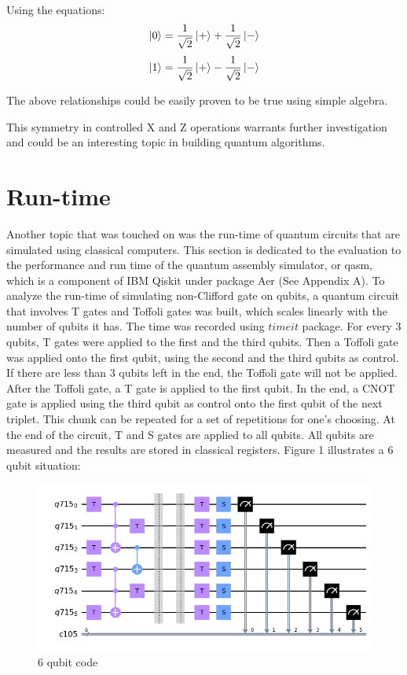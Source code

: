 \documentclass{article}
\begin{document}
Using the equations: 
\begin{equation}
    \ket{0} = \frac{1}{\sqrt{2}} \ket{+} + \frac{1}{\sqrt{2}} \ket{-}
\end{equation}
\begin{equation}
    \ket{1} = \frac{1}{\sqrt{2}} \ket{+} - \frac{1}{\sqrt{2}} \ket{-}
\end{equation}

The above relationships could be easily proven to be true using simple algebra.

This symmetry in controlled X and Z operations warrants further investigation and could be an interesting topic in building quantum algorithms.
\newpage
\section{Run-time}

Another topic that was touched on was the run-time of quantum circuits that are simulated using classical computers. This section is dedicated to the evaluation to the performance and run time of the quantum assembly simulator, or qasm, which is a component of IBM Qiskit under package Aer (See Appendix A). To analyze the run-time of simulating non-Clifford gate on qubits, a quantum circuit that involves T gates and Toffoli gates was built, which scales linearly with the number of qubits it has. The time was recorded using $timeit$ package. For every 3 qubits, T gates were applied to the first and the third qubits. Then a Toffoli gate was applied onto the first qubit, using the second and the third qubits as control. If there are less than 3 qubits left in the end, the Toffoli gate will not be applied. After the Toffoli gate, a T gate is applied to the first qubit. In the end, a CNOT gate is applied using the third qubit as control onto the first qubit of the next triplet. This chunk can be repeated for a set of repetitions for one's choosing. At the end of the circuit, T and S gates are applied to all qubits. All qubits are measured and the results are stored in classical registers. Figure 1 illustrates a 6 qubit situation:

\begin{figure}[h]
    \centering
    \includegraphics[width = 0.8\linewidth]{runtime/6qubit.png}
    \caption{6 qubit code}
    \label{fig:my_label}
\end{figure}
\end{document}
